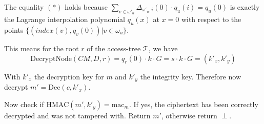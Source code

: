 The equality $(*)$ holds because $\sum_{v \in \omega'_u} \Delta_{\omega'_u, i}(0) \cdot q_u(i) = q_u(0)$ is exactly the Lagrange interpolation polynomial $q_u(x)$ at $x = 0$ with respect to the points $\{(index(v), q_v(0)) | v \in \omega_u\}$. 

This means for the root $r$ of the \gls{access-tree} $\mathcal{T}$, we have
\begin{equation*}
    \text{DecryptNode}(CM, D, r) =  q_r(0) \cdot k \cdot G = s \cdot k \cdot G = (k'_x, k'_y)
\end{equation*}

With $k'_x$ the decryption key for $m$ and $k'_y$ the integrity key. Therefore now decrypt $m' = \text{Dec}(c, k'_x)$.

Now check if $\text{HMAC}(m', k'_y) = \text{mac}_m$. If yes, the ciphertext has been correctly decrypted and was not tampered with. Return $m'$, otherwise return $\perp$.